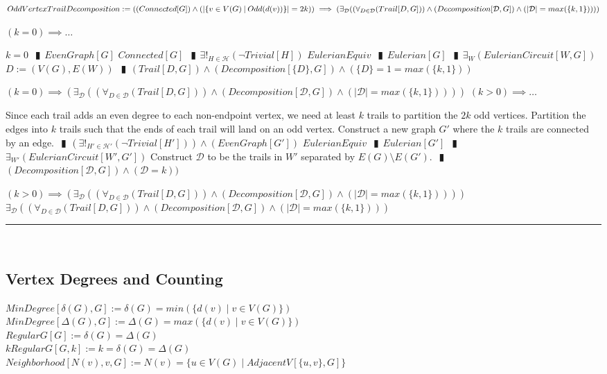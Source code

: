 \documentclass{book}
\newcommand{\abr}{:=}
\newcommand{\pipe}{$\phantom{(}\vrectangleblack\phantom{)}$}
\newcommand{\st}{\mathbin{|}}
\newcommand{\utup}[1]{\{#1\}}
\begin{document}
$OddVertexTrailDecomposition \abr ((Connected[G]) \land (|\{v \in V(G) \st Odd(d(v))\}| = 2 k)) \\
                                  \implies (\exists_{\mathcal{D}}((\forall_{D \in \mathcal{D}}(Trail[D, G])) \land (Decomposition[\mathcal{D}, G]) \land (|\mathcal{D}| = max(\{k, 1\}))))$
\begin{enumerate}
  \lit $(k = 0) \implies \ldots$
  \begin{enumerate}
    \lit $k = 0$ \pipe $EvenGraph[G]$
    \lit $Connected[G]$ \pipe $\exists!_{H \in \mathcal{H}}(\lnot Trivial[H])$
    \lit $EulerianEquiv$ \pipe $Eulerian[G]$ \pipe $\exists_{W}(EulerianCircuit[W, G])$
    \lit $D \abr (V(G), E(W))$ \pipe $(Trail[D, G]) \land (Decomposition[\{D\}, G]) \land (\{D\} = 1 = max(\{k, 1\}))$
  \end{enumerate}
  \lit $(k = 0) \implies (\exists_{\mathcal{D}}((\forall_{D \in \mathcal{D}}(Trail[D, G])) \land (Decomposition[\mathcal{D}, G]) \land (|\mathcal{D}| = max(\{k, 1\}))))$
  \lit $(k > 0) \implies \ldots$
  \begin{enumerate}
    \lit Since each trail adds an even degree to each non-endpoint vertex, we need at least $k$ trails to partition the $2 k$ odd vertices.
    \lit Partition the edges into $k$ trails such that the ends of each trail will land on an odd vertex.
    \lit Construct a new graph $G'$ where the $k$ trails are connected by an edge. \pipe $(\exists!_{H' \in \mathcal{H}'}(\lnot Trivial[H'])) \land (EvenGraph[G'])$
    \lit $EulerianEquiv$ \pipe $Eulerian[G']$ \pipe $\exists_{W'}(EulerianCircuit[W', G'])$
    \lit Construct $\mathcal{D}$ to be the trails in $W'$ separated by $E(G) \setminus E(G')$. \pipe $(Decomposition[\mathcal{D}, G]) \land (\mathcal{D} = k))$
  \end{enumerate}
  \lit $(k > 0) \implies (\exists_{\mathcal{D}}((\forall_{D \in \mathcal{D}}(Trail[D, G])) \land (Decomposition[\mathcal{D}, G]) \land (|\mathcal{D}| = max(\{k, 1\}))))$
  \lit $\exists_{\mathcal{D}}((\forall_{D \in \mathcal{D}}(Trail[D, G])) \land (Decomposition[\mathcal{D}, G]) \land (|\mathcal{D}| = max(\{k, 1\})))$
\end{enumerate} \vspace{.75mm} \hrule \vspace{.75mm} \ \\ 


\subsection{Vertex Degrees and Counting}
$MinDegree[\delta(G), G] \abr \delta(G) = min(\{d(v) \st v \in V(G)\})$ \\
$MinDegree[\Delta(G), G] \abr \Delta(G) = max(\{d(v) \st v \in V(G)\})$ \\
$RegularG[G] \abr \delta(G) = \Delta(G)$ \\
$kRegularG[G, k] \abr k = \delta(G) = \Delta(G)$ \\
$Neighborhood[N(v), v, G] \abr N(v) = \{u \in V(G) \st AdjacentV[\utup{u, v}, G]\}$ \\
\end{document}

